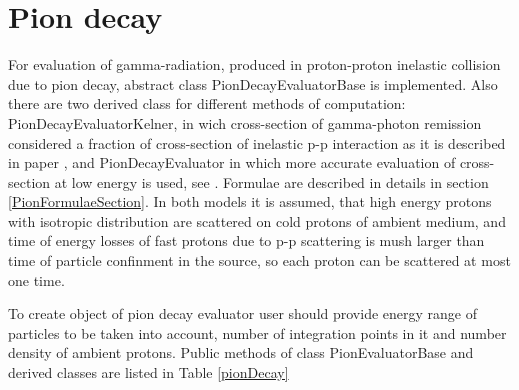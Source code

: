 \section{Pion decay}

For evaluation of gamma-radiation, produced in proton-proton inelastic collision due to pion decay, abstract class PionDecayEvaluatorBase is implemented. Also there are two derived class for different methods of computation: PionDecayEvaluatorKelner, in wich cross-section of gamma-photon remission considered a fraction of cross-section of inelastic p-p interaction as it is described in paper \cite{Kelner}, and PionDecayEvaluator in which more accurate evaluation of cross-section at low energy is used, see \cite{Kafexhiu}. Formulae are described in details in section \ref{PionFormulaeSection}. In both models it is assumed, that high energy protons with isotropic distribution are scattered on cold protons of ambient medium, and time of energy losses of fast protons due to p-p scattering is mush larger than time of particle confinment in the source, so each proton can be scattered at most one time.

To create object of pion decay evaluator user should provide energy range of particles to be taken into account, number of integration points in it and number density of ambient protons. Public methods of class PionEvaluatorBase and derived classes are listed in Table \ref{pionDecay}

